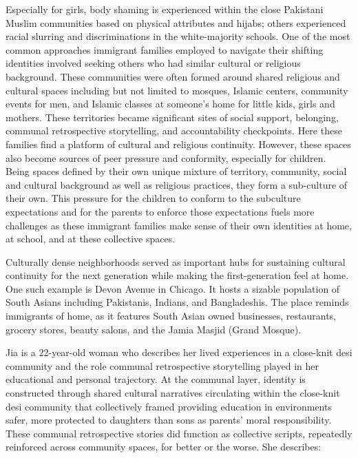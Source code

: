 Especially for girls, body shaming is experienced within the close Pakistani Muslim communities based on physical attributes and hijabs; others experienced racial slurring and discriminations in the white-majority schools. One of the most common approaches immigrant families employed to navigate their shifting identities involved seeking others who had similar cultural or religious background. These communities were often formed around shared religious and cultural spaces including but not limited to mosques, Islamic centers, community events for men, and Islamic classes at someone’s home for little kids, girls and mothers. These territories became significant sites of social support, belonging, communal retrospective storytelling, and accountability checkpoints. Here these families find a platform of cultural and religious continuity. However, these spaces also become sources of peer pressure and conformity, especially for children. Being spaces defined by their own unique mixture of territory, community, social and cultural background as well as religious practices, they form a sub-culture of their own. This pressure for the children to conform to the subculture expectations and for the parents to enforce those expectations fuels more challenges as these immigrant families make sense of their own identities at home, at school, and at these collective spaces.

Culturally dense neighborhoods served as important hubs for sustaining cultural continuity for the next generation while making the first-generation feel at home. One such example is Devon Avenue in Chicago. It hosts a sizable population of South Asians including Pakistanis, Indians, and Bangladeshis. The place reminds immigrants of home, as it features South Asian owned businesses, restaurants, grocery stores, beauty salons, and the Jamia Masjid (Grand Mosque).

Jia is a 22-year-old woman who describes her lived experiences in a close-knit desi community and the role communal retrospective storytelling played in her educational and personal trajectory. At the communal layer, identity is constructed through shared cultural narratives circulating within the close-knit desi community that collectively framed providing education in environments safer, more protected to daughters than sons as parents' moral responsibility. These communal retrospective stories did function as collective scripts, repeatedly reinforced across community spaces, for better or the worse. She describes:

